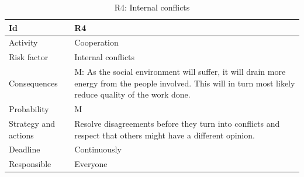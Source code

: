 \documentclass[11pt]{book}
\begin{document}
\begin{table}[H]
\centering
\begin{tabular}{ l  p{11cm} }
    Id                      & R4                                                                          \\ \hline
    Activity                & Cooperation                                                                 \\ \hline
    Risk factor             & Internal conflicts                                                          \\ \hline
    Consequences            & M: As the social environment will suffer, it will drain more energy from 
                                the people involved. This will in turn most likely reduce quality of 
                                the work done.                                                            \\ \hline
    Probability             & M                                                                           \\ \hline
    Strategy and actions    & Resolve disagreements before they turn into conflicts and respect that 
                              others might have a different opinion.                                      \\ \hline
    Deadline                & Continuously                                                                \\ \hline
    Responsible             & Everyone                                                                    \\ 
\end{tabular}
\label{tab:risk_4}
\caption{R4: Internal conflicts}
\end{table}
\end{document}
